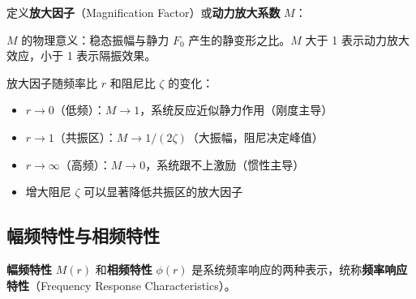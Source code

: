 定义\textbf{放大因子}（Magnification Factor）或\textbf{动力放大系数} $M$：
\begin{myformula}
    \end{myformula}

$M$ 的物理意义：稳态振幅与静力 $F_0$ 产生的静变形之比。$M$ 大于 1 表示动力放大效应，小于 1 表示隔振效果。

放大因子随频率比 $r$ 和阻尼比 $\zeta$ 的变化：
\begin{itemize}
    \item $r \to 0$（低频）：$M \to 1$，系统反应近似静力作用（刚度主导）
    \item $r \to 1$（共振区）：$M \to 1/(2\zeta)$（大振幅，阻尼决定峰值）
    \item $r \to \infty$（高频）：$M \to 0$，系统跟不上激励（惯性主导）
    \item 增大阻尼 $\zeta$ 可以显著降低共振区的放大因子
\end{itemize}

\subsection{幅频特性与相频特性}

\textbf{幅频特性} $M(r)$ 和\textbf{相频特性} $\phi(r)$ 是系统频率响应的两种表示，统称\textbf{频率响应特性}（Frequency Response Characteristics）。

